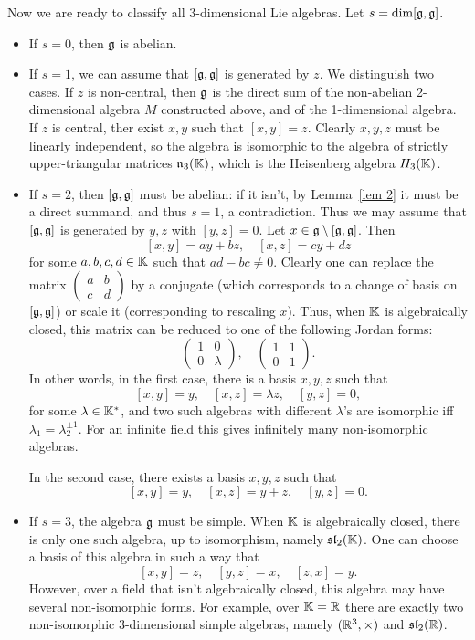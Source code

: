 Now we are ready to classify all 3-dimensional Lie algebras. Let $s=\dim[\mathfrak{g},\mathfrak{g}]$.
\begin{itemize}
    \item If $s=0$, then $\mathfrak{g}$ is abelian.
    \item If $s=1$, we can assume that $[\mathfrak{g},\mathfrak{g}]$ is generated by $z$. We distinguish two cases. If $z$ is non-central, then $\mathfrak{g}$ is the direct sum of the non-abelian 2-dimensional algebra $M$ constructed above, and of the 1-dimensional algebra. If $z$ is central, ther exist $x,y$ such that $[x,y]=z$. Clearly $x,y,z$ must be linearly independent, so the algebra is isomorphic to the algebra of strictly upper-triangular matrices $\mathfrak{n}_3(\mathbb{K})$, which is the Heisenberg algebra $H_3(\mathbb{K})$.
    \item If $s=2$, then $[\mathfrak{g},\mathfrak{g}]$ must be abelian: if it isn't, by Lemma~\ref{lem 2} it must be a direct summand, and thus $s=1$, a contradiction. Thus we may assume that $[\mathfrak{g},\mathfrak{g}]$ is generated by $y,z$ with $[y,z]=0$. Let $x\in \mathfrak{g}\setminus[\mathfrak{g},\mathfrak{g}]$. Then
    \[[x,y]=ay+bz,\quad [x,z]=cy+dz\]
    for some $a,b,c,d\in\mathbb{K}$ such that $ad-bc\neq 0$. Clearly one can replace the matrix $\begin{pmatrix}
        a&b\\c&d
    \end{pmatrix}$
    by a conjugate (which corresponds to a change of basis on $[\mathfrak{g},\mathfrak{g}]$) or scale it (corresponding to rescaling $x$). Thus, when $\mathbb{K}$ is algebraically closed, this matrix can be reduced to one of the following Jordan forms:
    \[\begin{pmatrix}
        1&0\\
        0&\lambda
    \end{pmatrix},\quad 
    \begin{pmatrix}
        1&1\\
        0&1
    \end{pmatrix}.\]
    In other words, in the first case, there is a basis $x,y,z$ such that
    \[[x,y]=y,\quad [x,z]=\lambda z,\quad [y,z]=0,\]
    for some $\lambda\in\mathbb{K}^\ast$, and two such algebras with different $\lambda$'s are isomorphic iff $\lambda_1=\lambda_2^{\pm 1}$. For an infinite field this gives infinitely many non-isomorphic algebras. 

    In the second case, there exists a basis $x,y,z$ such that
    \[[x,y]=y,\quad [x,z]=y+z,\quad [y,z]=0.\]

    \item If $s=3$, the algebra $\mathfrak{g}$ must be simple. When $\mathbb{K}$ is algebraically closed, there is only one such algebra, up to isomorphism, namely $\mathfrak{sl}_2(\mathbb{K})$. One can choose a basis of this algebra in such a way that 
    \[[x,y]=z,\quad [y,z]=x,\quad [z,x]=y.\]
    However, over a field that isn't algebraically closed, this algebra may have several non-isomorphic forms. For example, over $\mathbb{K}=\mathbb{R}$ there are exactly two non-isomorphic 3-dimensional simple algebras, namely $(\mathbb{R}^3,\times)$ and $\mathfrak{sl}_2(\mathbb{R})$.
\end{itemize}



